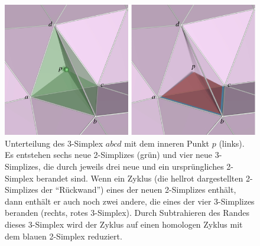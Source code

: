 %
%
%
\begin{figure}
\centering
\includegraphics{chapters/120-topologie/images/zyklus.pdf}
\caption{Unterteilung des 3-Simplex $abcd$ mit dem inneren Punkt $p$
(links).
Es entstehen sechs neue 2-Simplizes ({\color{darkgreen}grün}) und vier
neue 3-Simplizes, die durch jeweils drei neue und ein ursprüngliches
2-Simplex berandet sind.
Wenn ein Zyklus (die hellrot dargestellten 2-Simplizes der ``Rückwand'')
eines der neuen 2-Simplizes enthält, dann enthält
er auch noch zwei andere, die eines der vier 3-Simplizes beranden
(rechts, rotes 3-Simplex).
Durch Subtrahieren des Randes dieses 3-Simplex 
wird der Zyklus auf einen homologen Zyklus mit dem blauen 2-Simplex
reduziert.
\label{buch:topologie:simplex:fig:zyklus}}
\end{figure}
